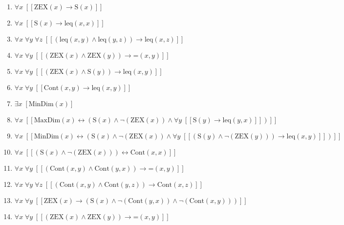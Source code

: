 \documentclass{article}
\begin{document}
\begin{enumerate}
\item $\forall x\;  \left[ \left[ \textrm{ZEX}(x) \rightarrow \textrm{S}(x) \right] \right]$
\item $\forall x\;  \left[ \left[ \textrm{S}(x) \rightarrow \textrm{leq}(x,x) \right] \right]$
\item $\forall x\; \forall y\; \forall z\;  \left[ \left[ \left(\textrm{leq}(x,y) \land \textrm{leq}(y,z)\right) \rightarrow \textrm{leq}(x,z) \right] \right]$
\item $\forall x\; \forall y\;  \left[ \left[ \left(\textrm{ZEX}(x) \land \textrm{ZEX}(y)\right) \rightarrow \textrm{=}(x,y) \right] \right]$
\item $\forall x\; \forall y\;  \left[ \left[ \left(\textrm{ZEX}(x) \land \textrm{S}(y)\right) \rightarrow \textrm{leq}(x,y) \right] \right]$
\item $\forall x\; \forall y\;  \left[ \left[ \textrm{Cont}(x,y) \rightarrow \textrm{leq}(x,y) \right] \right]$
\item $\exists x\;  \left[ \textrm{MinDim}(x) \right]$
\item $\forall x\;  \left[ \left[ \textrm{MaxDim}(x) \leftrightarrow \left(\textrm{S}(x) \land \neg \left(\textrm{ZEX}(x)\right) \land \forall y\;  \left[ \left[ \textrm{S}(y) \rightarrow \textrm{leq}(y,x) \right] \right]\right) \right] \right]$
\item $\forall x\;  \left[ \left[ \textrm{MinDim}(x) \leftrightarrow \left(\textrm{S}(x) \land \neg \left(\textrm{ZEX}(x)\right) \land \forall y\;  \left[ \left[ \left(\textrm{S}(y) \land \neg \left(\textrm{ZEX}(y)\right)\right) \rightarrow \textrm{leq}(x,y) \right] \right]\right) \right] \right]$
\item $\forall x\;  \left[ \left[ \left(\textrm{S}(x) \land \neg \left(\textrm{ZEX}(x)\right)\right) \leftrightarrow \textrm{Cont}(x,x) \right] \right]$
\item $\forall x\; \forall y\;  \left[ \left[ \left(\textrm{Cont}(x,y) \land \textrm{Cont}(y,x)\right) \rightarrow \textrm{=}(x,y) \right] \right]$
\item $\forall x\; \forall y\; \forall z\;  \left[ \left[ \left(\textrm{Cont}(x,y) \land \textrm{Cont}(y,z)\right) \rightarrow \textrm{Cont}(x,z) \right] \right]$
\item $\forall x\; \forall y\;  \left[ \left[ \textrm{ZEX}(x) \rightarrow \left(\textrm{S}(x) \land \neg \left(\textrm{Cont}(y,x)\right) \land \neg \left(\textrm{Cont}(x,y)\right)\right) \right] \right]$
\item $\forall x\; \forall y\;  \left[ \left[ \left(\textrm{ZEX}(x) \land \textrm{ZEX}(y)\right) \rightarrow \textrm{=}(x,y) \right] \right]$

\end{enumerate}
\end{document}
